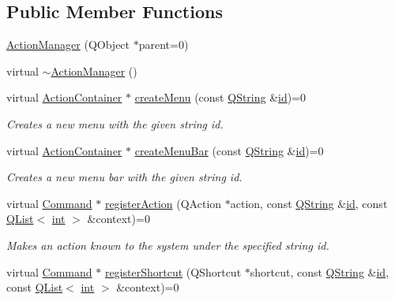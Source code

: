 \subsection*{Public Member Functions}
\begin{DoxyCompactItemize}
\item 
\hyperlink{group___core_plugin_gab0f34dc9c6d367a0807cef1003bc3667}{Action\-Manager} (Q\-Object $\ast$parent=0)
\item 
virtual \hyperlink{group___core_plugin_gac80d3d645622551a98db65a649abe079}{$\sim$\-Action\-Manager} ()
\item 
virtual \hyperlink{class_core_1_1_action_container}{Action\-Container} $\ast$ \hyperlink{group___core_plugin_ga5affc8a59dfae8d4d00779b9f8390c22}{create\-Menu} (const \hyperlink{group___u_a_v_objects_plugin_gab9d252f49c333c94a72f97ce3105a32d}{Q\-String} \&\hyperlink{glext_8h_a58c2a664503e14ffb8f21012aabff3e9}{id})=0
\begin{DoxyCompactList}\small\item\em Creates a new menu with the given string {\itshape id}. \end{DoxyCompactList}\item 
virtual \hyperlink{class_core_1_1_action_container}{Action\-Container} $\ast$ \hyperlink{group___core_plugin_gaa00e94317a705be8cf40afc32368c4b4}{create\-Menu\-Bar} (const \hyperlink{group___u_a_v_objects_plugin_gab9d252f49c333c94a72f97ce3105a32d}{Q\-String} \&\hyperlink{glext_8h_a58c2a664503e14ffb8f21012aabff3e9}{id})=0
\begin{DoxyCompactList}\small\item\em Creates a new menu bar with the given string {\itshape id}. \end{DoxyCompactList}\item 
virtual \hyperlink{class_core_1_1_command}{Command} $\ast$ \hyperlink{group___core_plugin_ga316dd0cff29b294cd1b0631677f6357d}{register\-Action} (Q\-Action $\ast$action, const \hyperlink{group___u_a_v_objects_plugin_gab9d252f49c333c94a72f97ce3105a32d}{Q\-String} \&\hyperlink{glext_8h_a58c2a664503e14ffb8f21012aabff3e9}{id}, const \hyperlink{class_q_list}{Q\-List}$<$ \hyperlink{ioapi_8h_a787fa3cf048117ba7123753c1e74fcd6}{int} $>$ \&context)=0
\begin{DoxyCompactList}\small\item\em Makes an {\itshape action} known to the system under the specified string {\itshape id}. \end{DoxyCompactList}\item 
virtual \hyperlink{class_core_1_1_command}{Command} $\ast$ \hyperlink{group___core_plugin_ga74e32e1f8008da2d536cc688b32d111f}{register\-Shortcut} (Q\-Shortcut $\ast$shortcut, const \hyperlink{group___u_a_v_objects_plugin_gab9d252f49c333c94a72f97ce3105a32d}{Q\-String} \&\hyperlink{glext_8h_a58c2a664503e14ffb8f21012aabff3e9}{id}, const \hyperlink{class_q_list}{Q\-List}$<$ \hyperlink{ioapi_8h_a787fa3cf048117ba7123753c1e74fcd6}{int} $>$ \&context)=0

\end{DoxyCompactItemize}
